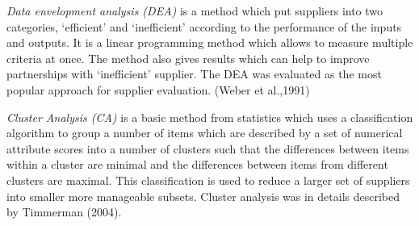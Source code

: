 \documentclass[oneside,12pt]{article}%
\begin{document}
\emph{Data envelopment analysis (DEA)} is a method which put suppliers into two categories, ‘efficient’ and ‘inefficient’ according to the performance of the inputs and outputs. It is a linear programming method which allows to measure multiple criteria at once. The method also gives results which can help to improve partnerships with ‘inefficient’ supplier. The DEA was evaluated as the most popular approach for supplier evaluation. (Weber et al.,1991) \par

\emph{Cluster Analysis (CA)} is a basic method from statistics which uses a classification algorithm to group a number of items which are described by a set of numerical attribute scores into a number of clusters such that the differences between items within a cluster are minimal and the differences between items from different clusters are maximal. This classification is used to reduce a larger set of suppliers into smaller more manageable subsets. Cluster analysis was in details described by Timmerman (2004).
\end{document}
